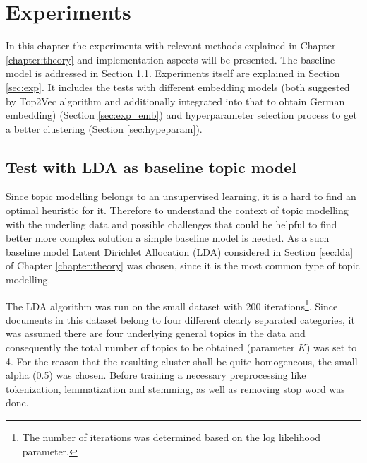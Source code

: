 \documentclass[fontsize=12pt,a4paper,twoside,openany]{scrbook}
\begin{document}
\chapter{Experiments}
\label{chap:exp}

In this chapter the experiments with relevant methods explained in Chapter \ref{chapter:theory} and implementation aspects will be presented. The baseline model is addressed in Section \ref{sec:lda_baseline}. Experiments itself are explained in Section \ref{sec:exp}. It includes the tests with different embedding models (both suggested by Top2Vec algorithm and additionally integrated into that to obtain German embedding) (Section \ref{sec:exp_emb}) and hyperparameter selection process to get a better clustering (Section \ref{sec:hypeparam}).

\section{Test with LDA as baseline topic model}
\label{sec:lda_baseline}

Since topic modelling belongs to an unsupervised learning, it is a hard to find an optimal heuristic for it. Therefore to understand the context of topic modelling with the underling data and possible challenges that could be helpful to find better more complex solution a simple baseline model is needed. As a such baseline model Latent Dirichlet Allocation (LDA) considered in Section \ref{sec:lda} of Chapter \ref{chapter:theory} was chosen, since it is the most common type of topic modelling.

The LDA algorithm was run on the small dataset with 200 iterations\footnote{The number of iterations was determined based on the log likelihood parameter.}. Since documents in this dataset belong to four different clearly separated categories, it was assumed there are four underlying general topics in the data and consequently the total number of topics to be obtained (parameter \(K\)) was set to 4. For the reason that the resulting cluster shall be quite homogeneous, the small alpha (0.5) was chosen. Before training a necessary preprocessing like tokenization, lemmatization and stemming, as well as removing stop word was done.
\end{document}
